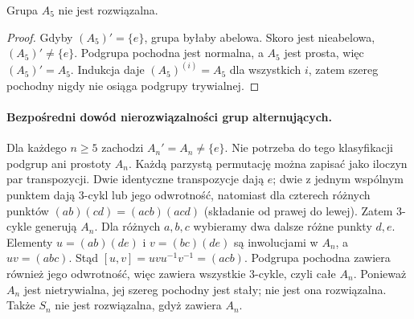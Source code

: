 \begin{wniosek}
\label{aa:wn:a5-not-solvable}
Grupa $A_5$ nie jest rozwiązalna.
\end{wniosek}
\begin{proof}
Gdyby $(A_5)'=\{e\}$, grupa byłaby abelowa.
Skoro jest nieabelowa, $(A_5)'\ne\{e\}$.
Podgrupa pochodna jest normalna, a $A_5$ jest prosta,
więc $(A_5)'=A_5$. Indukcja daje $(A_5)^{(i)}=A_5$
dla wszystkich $i$, zatem szereg pochodny nigdy nie osiąga
podgrupy trywialnej.
\end{proof}

\paragraph{Bezpośredni dowód nierozwiązalności grup alternujących.}
Dla każdego $n\ge5$ zachodzi $A_n'=A_n\ne\{e\}$.
Nie potrzeba do tego klasyfikacji podgrup ani prostoty $A_n$.
Każdą parzystą permutację można zapisać jako iloczyn par
transpozycji. Dwie identyczne transpozycje dają $e$;
dwie z jednym wspólnym punktem dają $3$-cykl lub jego
odwrotność, natomiast dla czterech różnych punktów
$(ab)(cd)=(acb)(acd)$ (składanie od prawej do lewej).
Zatem $3$-cykle generują $A_n$.
Dla różnych $a,b,c$ wybieramy dwa dalsze różne punkty $d,e$.
Elementy $u=(ab)(de)$ i $v=(bc)(de)$ są inwolucjami w $A_n$,
a $uv=(abc)$. Stąd
$[u,v]=uvu^{-1}v^{-1}=(acb)$.
Podgrupa pochodna zawiera również jego odwrotność,
więc zawiera wszystkie $3$-cykle, czyli całe $A_n$.
Ponieważ $A_n$ jest nietrywialna, jej szereg pochodny jest
stały; nie jest ona rozwiązalna. Także $S_n$ nie jest
rozwiązalna, gdyż zawiera $A_n$.

